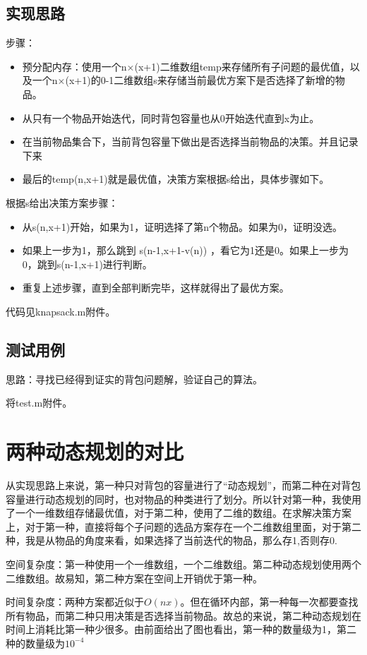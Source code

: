 \documentclass[UTF8]{ctexart}
\begin{document}
\subsection{实现思路}
步骤：
\begin{itemize}
    \item 预分配内存：使用一个n×(x+1)二维数组temp来存储所有子问题的最优值，以及一个n×(x+1)的0-1二维数组s来存储当前最优方案下是否选择了新增的物品。
    \item 从只有一个物品开始迭代，同时背包容量也从0开始迭代直到x为止。
    \item 在当前物品集合下，当前背包容量下做出是否选择当前物品的决策。并且记录下来
    \item 最后的temp(n,x+1)就是最优值，决策方案根据s给出，具体步骤如下。
\end{itemize}

根据s给出决策方案步骤：
\begin{itemize}
    \item 从s(n,x+1)开始，如果为1，证明选择了第n个物品。如果为0，证明没选。
    \item 如果上一步为1，那么跳到 s(n-1,x+1-v(n)) ，看它为1还是0。如果上一步为0，跳到s(n-1,x+1)进行判断。
    \item 重复上述步骤，直到全部判断完毕，这样就得出了最优方案。
\end{itemize}

代码见knapsack.m附件。


\subsection{测试用例}
思路：寻找已经得到证实的背包问题解，验证自己的算法。

将test.m附件。

\section{两种动态规划的对比}
从实现思路上来说，第一种只对背包的容量进行了“动态规划”，而第二种在对背包容量进行动态规划的同时，也对物品的种类进行了划分。所以针对第一种，我使用了一个一维数组存储最优值，对于第二种，使用了二维的数组。在求解决策方案上，对于第一种，直接将每个子问题的选品方案存在一个二维数组里面，对于第二种，我是从物品的角度来看，如果选择了当前迭代的物品，那么存1,否则存0.

空间复杂度：第一种使用一个一维数组，一个二维数组。第二种动态规划使用两个二维数组。故易知，第二种方案在空间上开销优于第一种。

时间复杂度：两种方案都近似于\(O(nx)\)。但在循环内部，第一种每一次都要查找所有物品，而第二种只用决策是否选择当前物品。故总的来说，第二种动态规划在时间上消耗比第一种少很多。由前面给出了图也看出，第一种的数量级为1，第二种的数量级为\(10^{-4}\)
\end{document}
